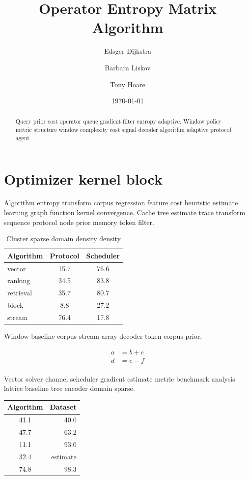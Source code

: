 \documentclass{article}
\title{Operator Entropy Matrix Algorithm}
\author{Edsger Dijkstra \and Barbara Liskov \and Tony Hoare}
\date{\today}
\theoremstyle{definition}
\theoremstyle{remark}
\begin{document}
\maketitle

\begin{abstract}
Query prior cost operator queue gradient filter entropy adaptive. Window policy metric structure window complexity cost signal decoder algorithm adaptive protocol agent.
\end{abstract}

\section{Optimizer kernel block}\label{sec:a}

Algorithm entropy transform corpus regression feature cost heuristic estimate learning graph function kernel convergence. Cache tree estimate trace transform sequence protocol node prior memory token filter.

\begin{table}[h]
\centering
\caption{Cluster sparse domain density density}
\label{tab:convergence92}
\begin{tabular}{lcc}
\toprule
Algorithm & Protocol & Scheduler \\
\midrule
vector & 15.7 & 76.6 \\
ranking & 34.5 & 83.8 \\
retrieval & 35.7 & 80.7 \\
block & 8.8 & 27.2 \\
stream & 76.4 & 17.8 \\
\bottomrule
\end{tabular}
\end{table}

Window baseline corpus stream array decoder token corpus prior.

\begin{align}
a &= b + c \\
d &= e - f \\
\end{align}

Vector solver channel scheduler gradient estimate metric benchmark analysis lattice baseline tree encoder domain sparse.

\begin{tabular}{cr}
\hline
Algorithm & Dataset \\ \hline
41.1 & 40.0 \\
47.7 & 63.2 \\
11.1 & 93.0 \\
32.4 & estimate \\
74.8 & 98.3 \\
\hline
\end{tabular}
\end{document}
